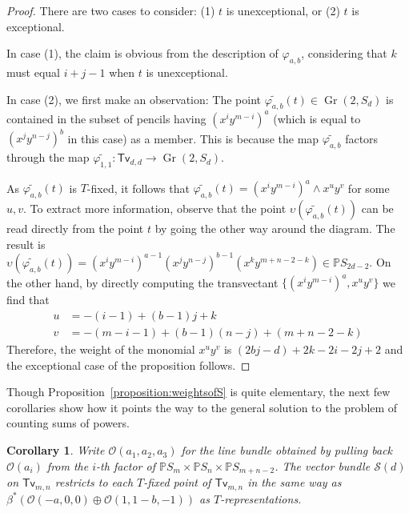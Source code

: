\documentclass[12pt]{article}
\theoremstyle{plain}
\newtheorem{corollary}[theorem]{Corollary}
\theoremstyle{remark}
\renewcommand{\P}{\mathbb{P}}
\newcommand{\Gr}{\operatorname{Gr}}
\renewcommand{\O}{\mathscr{O}}
\renewcommand{\S}{\mathscr{S}}
\newcommand{\transvectant}{\mathsf{Tv}}
\begin{document}
\begin{proof}
    \label{proof:weightsofS}
    There are two cases to consider: (1) $t$ is unexceptional, or (2) $t$ is exceptional.


    In case (1), the claim is obvious from the description of $\varphi_{a,b}$, considering that $k$ must equal $i+j-1$ when $t$ is unexceptional.

    In case (2), we first make an observation: The point $\widetilde{\varphi_{a,b}}(t) \in \Gr(2,S_{d})$ is contained in the subset of pencils having $(x^{i}y^{m-i})^{a}$ (which is equal to $(x^{j}y^{n-j})^{b}$ in this case) as a member. This is because the map $\widetilde{\varphi_{a,b}}$ factors through the map $\widetilde{\varphi_{1,1}}: \transvectant_{d,d} \to \Gr(2,S_{d})$.

    As $\widetilde{\varphi_{a,b}}(t)$ is $T$-fixed, it follows that $\widetilde{\varphi_{a,b}}(t) = (x^{i}y^{m-i})^{a} \wedge x^{u}y^{v}$ for some $u,v$. To extract more information, observe that the point $\upsilon(\widetilde{\varphi_{a,b}}(t))$ can be read directly from the point $t$ by going the other way around the diagram. The result is $\upsilon(\widetilde{\varphi_{a,b}}(t)) = (x^{i}y^{m-i})^{a-1}(x^{j}y^{n-j})^{b-1}(x^{k}y^{m+n-2-k}) \in \P S_{2d-2}.$  On the other hand, by directly computing the transvectant $\{(x^{i}y^{m-i})^{a} , x^{u}y^{v} \}$ we find that
    \begin{align*}
        u &= -(i-1) + (b-1)j + k\\
        v &= -(m-i-1) + (b-1)(n-j) + (m+n-2-k)
    \end{align*}
    Therefore, the weight of the monomial $x^{u}y^{v}$ is $(2bj-d)+2k-2i -2j+2$ and the exceptional case of the proposition follows.
\end{proof}

Though Proposition~\ref{proposition:weightsofS} is quite elementary, the next few corollaries show how it points the way to the general solution to the problem of counting sums of powers.

\begin{corollary}
\label{corollary:samerestriction}
Write $\O(a_1,a_2,a_3)$ for the line bundle obtained by pulling back $\O(a_{i})$ from the $i$-th factor of $\P S_{m} \times \P S_{n} \times \P S_{m+n-2}$. The vector bundle $\S(d)$ on $\transvectant_{m,n}$ restricts to each $T$-fixed point of $\transvectant_{m,n}$ in the same way as $\beta^{*}\left(\O(-a,0,0) \oplus \O(1,1-b,-1)\right)$ as $T$-representations.
\end{corollary}
\end{document}
